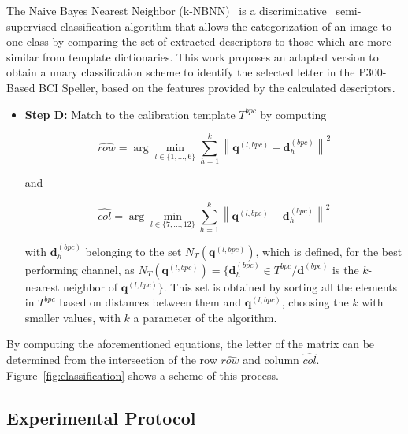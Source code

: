 \documentclass[utf8]{frontiersSCNS} %
\begin{document}
The Naive Bayes Nearest Neighbor (k-NBNN)~\citep{Boiman2008} is a discriminative~\citep{WolpawJonathanR2012} semi-supervised classification algorithm that allows the categorization of an image to one class by comparing the set of extracted descriptors to those which are more similar from template dictionaries.  This work proposes an adapted version to obtain a unary classification scheme to identify the selected letter in the P300-Based BCI Speller, based on the features provided by the calculated descriptors.  

\begin{itemize}

\item \textbf{Step D:} Match to the calibration template $T^{bpc}$ by computing  

\begin{equation}
\hat{row} = \arg \min_{l \in \{1,\dots,6\}} \sum_{h=1}^{k}  {\left\lVert \mathbf{q}^{(l,bpc)} -  \mathbf{d}_{h}^{(bpc)} \right\rVert}  ^{2}
\label{eq:multiclassificationrow}
\end{equation}

\noindent and

\begin{equation}
\hat{col} = \arg \min_{l \in \{7,\dots,12\}} \sum_{h=1}^{k}  {\left\lVert \mathbf{q}^{(l,bpc)} -  \mathbf{d}_{h}^{(bpc)} \right\rVert}  ^{2}
\label{eq:multiclassificationcol}
\end{equation}

\noindent with $\mathbf{d}_{h}^{(bpc)}$ belonging to the set $N_T( \mathbf{q}^{(l,bpc)}  )$, which is defined, for the best performing channel,  as $N_T(\mathbf{q}^{(l,bpc)} ) = \{ \mathbf{d}_{h}^{(bpc)} \in T^{bpc} /  \mathbf{d}^{(bpc)} $  is the $k$-nearest neighbor of $ \mathbf{q}^{(l,bpc)} \}$. This set is obtained by sorting all the elements in $T^{bpc}$ based on distances between them and $\mathbf{q}^{(l,bpc)}$, choosing the $k$ with smaller values, with $k$ a parameter of the algorithm.  

\end{itemize}
By computing the aforementioned equations, the letter of the matrix can be determined from the intersection of the row $ \hat{row} $ and column $ \hat{col} $. 
Figure~\ref{fig:classification} shows a scheme of this process. 

\subsection{Experimental Protocol} \label{Protocol}
\end{document}
